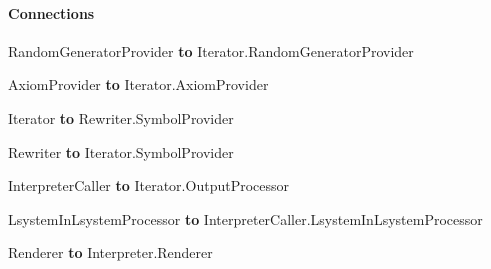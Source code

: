 	\paragraph{Connections}
	\begin{itemize*}
		\item RandomGeneratorProvider \textbf{to} Iterator.RandomGeneratorProvider
		\item AxiomProvider \textbf{to} Iterator.AxiomProvider
		\item Iterator \textbf{to} Rewriter.SymbolProvider
		\item Rewriter \textbf{to} Iterator.SymbolProvider
		\item InterpreterCaller \textbf{to} Iterator.OutputProcessor
		\item LsystemInLsystemProcessor \textbf{to} InterpreterCaller.LsystemInLsystemProcessor
		\item Renderer \textbf{to} Interpreter.Renderer
	\end{itemize*}
